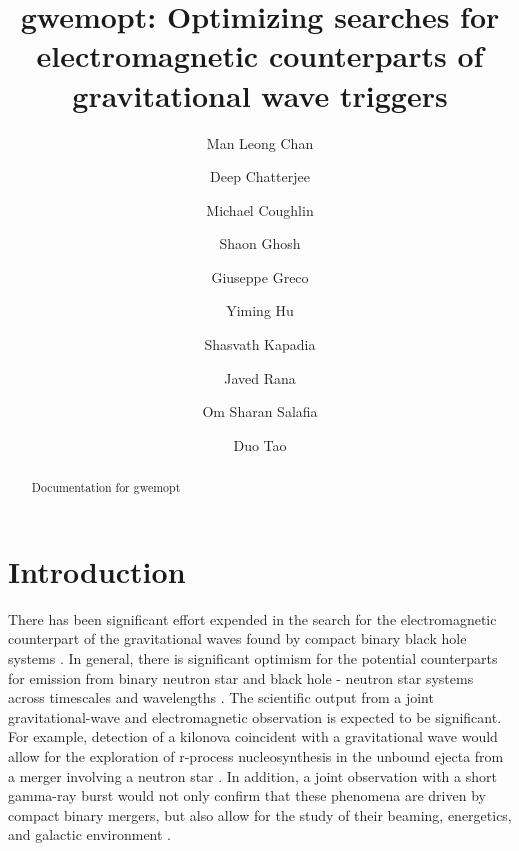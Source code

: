 \documentclass[twocolumn]{aastex61}
\begin{document}
\title{gwemopt: Optimizing searches for electromagnetic counterparts of gravitational wave triggers}

\author{Man Leong Chan}

\author{Deep Chatterjee}

\author{Michael Coughlin}

\author{Shaon Ghosh}

\author{Giuseppe Greco}

\author{Yiming Hu}

\author{Shasvath Kapadia}

\author{Javed Rana}

\author{Om Sharan Salafia}

\author{Duo Tao}

\begin{abstract}

Documentation for gwemopt

\end{abstract}


\section{Introduction}
\label{sec:Intro}

There has been significant effort expended in the search for the electromagnetic counterpart of the gravitational waves found by compact binary black hole systems \citep{AbEA2016a,AbEA2016g,AbEA2017}.
In general, there is significant optimism for the potential counterparts for emission from binary neutron star and black hole - neutron star systems across timescales and wavelengths \citep{Nakar2007,MeBe2012}. 
The scientific output from a joint gravitational-wave and electromagnetic observation is expected to be significant. For example, detection of a kilonova coincident with a gravitational wave would allow for the exploration of r-process nucleosynthesis in the unbound ejecta from a merger involving a neutron star \cite{MeBa2015}.
In addition, a joint observation with a short gamma-ray burst would not only confirm that these phenomena are driven by compact binary mergers, but also allow for the study of their beaming, energetics, and galactic environment \cite{MeBe2012}.
\end{document}
